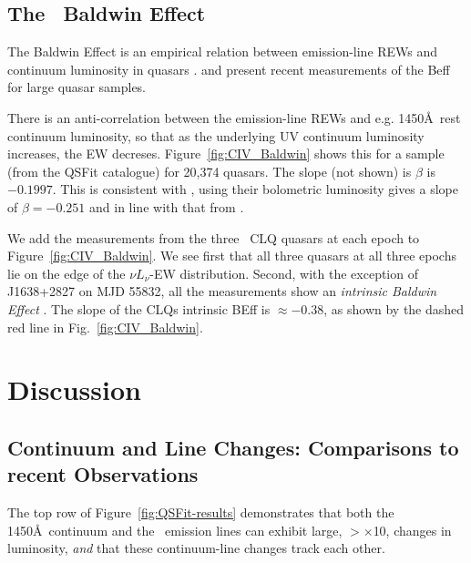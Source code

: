 \documentclass[fleqn,usenatbib]{mnras}
\begin{document}
\subsection{The \civ\ Baldwin Effect}
The Baldwin Effect \citep[Beff; ][]{Baldwin1977} is an empirical 
relation between emission-line REWs and continuum luminosity in
quasars \citep[][]{Shields2007, Hamann2017, Calderone2017}.
\citet{Hamann2017} and \citet{Calderone2017} present recent
measurements of the Beff for large quasar samples. 

There is an anti-correlation between the emission-line REWs and
e.g. 1450\AA\ rest continuum luminosity, so that as the underlying UV
continuum luminosity increases, the EW decreses. 
Figure~\ref{fig:CIV_Baldwin} shows this for a sample (from the QSFit catalogue)
for 20,374 quasars.  The slope (not shown) is $\beta$ is $-0.1997$.
This is consistent with \citet{Kozlowski2017}, using their bolometric
luminosity gives a slope of $\beta=-0.251$ and in line with that from
\citet[][ $\beta=-0.23$]{Hamann2017}.

We add the measurements from the three \civ\ CLQ quasars at each epoch
to Figure~\ref{fig:CIV_Baldwin}. We see first that all three quasars
at all three epochs lie on the edge of the $\nu L_{\nu}$-EW
distribution.  Second, with the exception of J1638+2827 on MJD 55832,
all the measurements show an {\it intrinsic Baldwin Effect}
\citep[e.g.][]{Goad2004, Rakic2017}.  The slope of the CLQs intrinsic
BEff is $\approx-0.38$, as shown by the dashed red line in
Fig.~\ref{fig:CIV_Baldwin}.




\section{Discussion}
\subsection{Continuum and Line Changes: Comparisons to recent Observations}
The top row of Figure~\ref{fig:QSFit-results} demonstrates that
both the 1450\AA\ continuum and the \civ\ emission lines can
exhibit large, $>$$\times$10, changes in luminosity, {\it and}
that these continuum-line changes track each other. 
\end{document}
